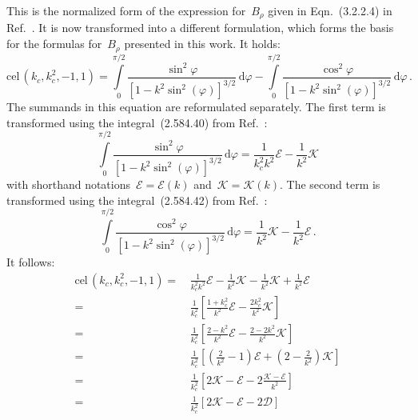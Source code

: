 This is the normalized form of the expression for~$B_\rho$ given in Eqn.~(3.2.2.4) in Ref.~\cite{teal}.
It is now transformed into a different formulation, which forms the basis for the formulas for~$B_\rho$ presented in this work.
It holds:
\begin{equation}
   \textrm{cel}\,(k_c, k_c^2, -1, 1)
 =   \int\limits_0^{\pi/2} \frac{\sin^2{\varphi}}{\left[1 - k^2 \sin^2(\varphi)\right]^{3/2}} \,\mathrm{d}\varphi
   - \int\limits_0^{\pi/2} \frac{\cos^2{\varphi}}{\left[1 - k^2 \sin^2(\varphi)\right]^{3/2}} \,\mathrm{d}\varphi \, .
\end{equation}
The summands in this equation are reformulated separately.
The first term is transformed using the integral~(2.584.40) from Ref.~\cite{gradshteyn_ryzhik}:
\begin{equation}
   \int\limits_0^{\pi/2} \frac{\sin^2{\varphi}}{\left[1 - k^2 \sin^2(\varphi)\right]^{3/2}} \,\mathrm{d}\varphi
 = \frac{1}{k_c^2 k^2} \mathcal{E} - \frac{1}{k^2} \mathcal{K}
\end{equation}
with shorthand notations~$\mathcal{E} = \mathcal{E}(k)$ and~$\mathcal{K} = \mathcal{K}(k)$.
The second term is transformed using the integral~(2.584.42) from Ref.~\cite{gradshteyn_ryzhik}:
\begin{equation}
   \int\limits_0^{\pi/2} \frac{\cos^2{\varphi}}{\left[1 - k^2 \sin^2(\varphi)\right]^{3/2}} \,\mathrm{d}\varphi
 = \frac{1}{k^2} \mathcal{K} - \frac{1}{k^2} \mathcal{E} \, .
\end{equation}
It follows:
\begin{align}
   \textrm{cel}\,(k_c, k_c^2, -1, 1)
 =&\,   \frac{1}{k_c^2 k^2} \mathcal{E} - \frac{1}{k^2} \mathcal{K}
      - \frac{1}{k^2}       \mathcal{K} + \frac{1}{k^2} \mathcal{E} \nonumber \\
 =&\, \frac{1}{k_c^2} \left[ \frac{1 + k_c^2}{k^2} \mathcal{E} - \frac{2 k_c^2}{k^2} \mathcal{K} \right] \nonumber \\
 =&\, \frac{1}{k_c^2} \left[ \frac{2 - k^2}{k^2} \mathcal{E} - \frac{2 - 2 k^2}{k^2} \mathcal{K} \right] \nonumber \\
 =&\, \frac{1}{k_c^2} \left[ \left(\frac{2}{k^2} - 1 \right) \mathcal{E} + \left(2 - \frac{2}{k^2} \right) \mathcal{K} \right] \nonumber \\
 =&\, \frac{1}{k_c^2} \left[ 2 \mathcal{K} - \mathcal{E} - 2 \frac{\mathcal{K} - \mathcal{E}}{k^2} \right] \nonumber \\
 =&\, \frac{1}{k_c^2} \left[ 2 \mathcal{K} - \mathcal{E} - 2 \mathcal{D} \right]
\end{align}
